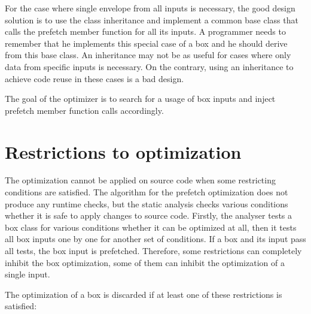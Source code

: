 For the case where single envelope from all inputs is necessary, the good design solution is to use the class inheritance and implement a common base class that calls the prefetch member function for all its inputs. A programmer needs to remember that he implements this special case of a box and he should derive from this base class. An inheritance may not be as useful for cases where only data from specific inputs is necessary. On the contrary, using an inheritance to achieve code reuse in these cases is a bad design.

The goal of the optimizer is to search for a usage of box inputs and inject prefetch member function calls accordingly.

\section{Restrictions to optimization}
\label{prefetch-restrictions}
The optimization cannot be applied on source code when some restricting conditions are satisfied. The algorithm for the prefetch optimization does not produce any runtime checks, but the static analysis checks various conditions whether it is safe to apply changes to source code. Firstly, the analyser tests a box class for various conditions whether it can be optimized at all, then it tests all box inputs one by one for another set of conditions. If a box and its input pass all tests, the box input is prefetched. Therefore, some restrictions can completely inhibit the box optimization, some of them can inhibit the optimization of a single input.

The optimization of a box is discarded if at least one of these restrictions is satisfied:

